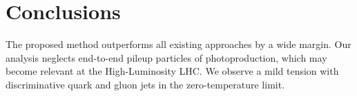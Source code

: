 \section{Conclusions}\label{sec:conclusions}

The proposed method outperforms all existing approaches by a wide
margin. Our analysis neglects end-to-end pileup particles of
photoproduction, which may become relevant at the High-Luminosity LHC.
We observe a mild tension with discriminative quark and gluon jets in
the zero-temperature limit.

